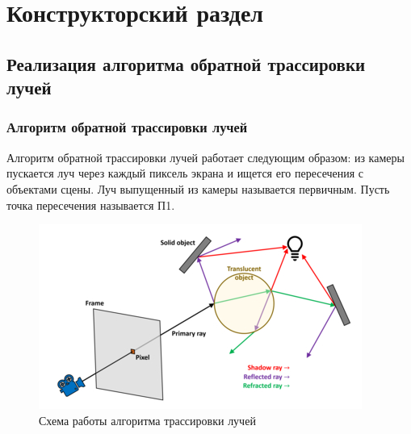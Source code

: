 \documentclass[12pt,a4paper,oneside]{report}
\begin{document}
	\chapter{Конструкторский раздел}
		\section{Реализация алгоритма обратной трассировки лучей}
			\subsection{Алгоритм обратной трассировки лучей}
				\quad Алгоритм обратной трассировки лучей работает следующим образом: из камеры пускается луч через каждый пиксель экрана и ищется его пересечения с объектами сцены. Луч выпущенный из камеры называется первичным. Пусть точка пересечения называется П1.
				
				\begin{figure}[h]
					\centering
					\includegraphics[scale=0.6]{trace}
					\caption{Схема работы алгоритма трассировки лучей}
					\label{fig:trace}
				\end{figure}				
				
\end{document}
